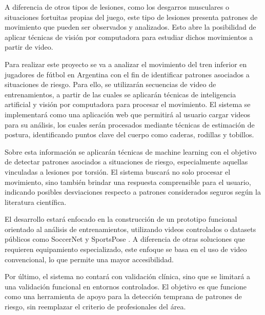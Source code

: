 A diferencia de otros tipos de lesiones, como los desgarros musculares o situaciones fortuitas propias del juego, este tipo de lesiones presenta patrones de movimiento que pueden ser observados y analizados. Esto abre la posibilidad de aplicar técnicas de visión por computadora para estudiar dichos movimientos a partir de video.

Para realizar este proyecto se va a analizar el movimiento del tren inferior en jugadores de fútbol en Argentina con el fin de identificar patrones asociados a situaciones de riesgo. Para ello, se utilizarán secuencias de video de entrenamientos, a partir de las cuales se aplicarán técnicas de inteligencia artificial y visión por computadora para procesar el movimiento. El sistema se implementará como una aplicación web que permitirá al usuario cargar videos para su análisis, los cuales serán procesados mediante técnicas de estimación de postura, identificando puntos clave del cuerpo como caderas, rodillas y tobillos.

Sobre esta información se aplicarán técnicas de machine learning con el objetivo de detectar patrones asociados a situaciones de riesgo, especialmente aquellas vinculadas a lesiones por torsión. El sistema buscará no solo procesar el movimiento, sino también brindar una respuesta comprensible para el usuario, indicando posibles desviaciones respecto a patrones considerados seguros según la literatura científica.

El desarrollo estará enfocado en la construcción de un prototipo funcional orientado al análisis de entrenamientos, utilizando videos controlados o datasets públicos como SoccerNet \parencite{GiancolaEtAl2018} y SportsPose \parencite{IngwersenEtAl2023}. A diferencia de otras soluciones que requieren equipamiento especializado, este enfoque se basa en el uso de video convencional, lo que permite una mayor accesibilidad.

Por último, el sistema no contará con validación clínica, sino que se limitará a una validación funcional en entornos controlados. El objetivo es que funcione como una herramienta de apoyo para la detección temprana de patrones de riesgo, sin reemplazar el criterio de profesionales del área.
